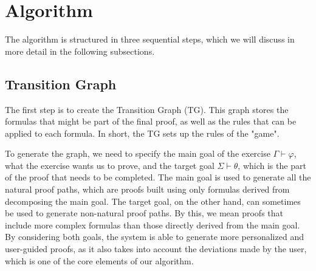 \section{Algorithm}
The algorithm is structured in three sequential steps, which we will discuss in more detail in the following subsections.


\subsection{Transition Graph}
The first step is to create the Transition Graph (TG). This graph stores the formulas that might be part of the final proof, as well as the rules that can be applied to each formula. In short, the TG sets up the rules of the "game".

To generate the graph, we need to specify the main goal of the exercise \(\Gamma \vdash \varphi\), what the exercise wants us to prove, and the target goal \(\Sigma \vdash \theta\), which is the part of the proof that needs to be completed. The main goal is used to generate all the natural proof paths, which are proofs built using only formulas derived from decomposing the main goal. The target goal, on the other hand, can sometimes be used to generate non-natural proof paths. By this, we mean proofs that include more complex formulas than those directly derived from the main goal. By considering both goals, the system is able to generate more personalized and user-guided proofs, as it also takes into account the deviations made by the user, which is one of the core elements of our algorithm.


